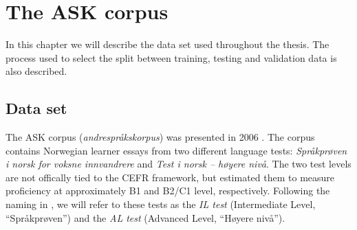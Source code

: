 \chapter{The ASK corpus}

In this chapter we will describe the data set used throughout the thesis. The
process used to select the split between training, testing and validation
data is also described.


\section{Data set}

The ASK corpus (\emph{andrespråkskorpus}) was presented in 2006
\autocite{tenfjord06}. The corpus contains Norwegian learner essays from two
different language tests: \emph{Språkprøven i norsk for voksne innvandrere}
and \emph{Test i norsk – høyere nivå}. The two test levels are not offically
tied to the CEFR framework, but \textcite{carlsen2012proficiency} estimated
them to measure proficiency at approximately B1 and B2/C1 level,
respectively. Following the naming in \textcite{carlsen2012proficiency}, we
will refer to these tests as the \emph{IL test} (Intermediate Level,
``Språkprøven'') and the \emph{AL test} (Advanced Level, ``Høyere nivå'').

